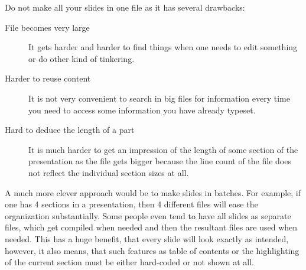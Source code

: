 \documentclass[
    draft
]{scrartcl}
\begin{document}
%

%
Do not make all your slides in one file as it has several drawbacks:
\begin{description}
    \item[File becomes very large]
        It gets harder and harder to find things when one needs to edit
            something or do other kind of tinkering.
    \item[Harder to reuse content]
        It is not very convenient to search in big files for information
            every time you need to access some information you have already
            typeset.
    \item[Hard to deduce the length of a part]
        It is much harder to get an impression of the length of some section of
            the presentation as the file gets bigger because the line count of
            the file does not reflect the individual section sizes at all.
\end{description}

%
A much more clever approach would be to make slides in batches.
%
For example, if one has 4 sections in a presentation, then 4 different files
    will ease the organization substantially.
%
Some people even tend to have all slides as separate  files, which
    get compiled when needed and then the resultant  files are used
    when needed.
%
This has a huge benefit, that every slide will look exactly as intended,
    however, it also means, that such features as table of contents or the
    highlighting of the current section must be either hard-coded or not shown
    at all.
\end{document}
